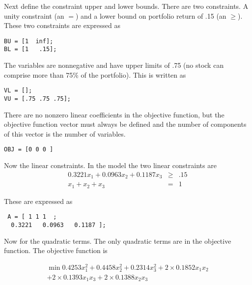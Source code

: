 \documentclass[11pt]{article}
\renewcommand{\_}{{\char"5F}}
\renewcommand{\{}{{\char"7B}}
\renewcommand{\}}{{\char"7D}}
\renewcommand{\^}{{\char"0D}}
\renewcommand{\'}{{\char"0D}}
\begin{document}
Next define the constraint upper and lower bounds. There are two constraints. A unity constraint (an $=$) and a lower bound on portfolio return of .15 (an $\ge$). These two constraints are expressed as



\begin{verbatim}
BU = [1  inf];
BL = [1   .15];
\end{verbatim}



The variables are nonnegative and have upper limits of .75 (no stock can comprise more than 75\% of the portfolio).  This is written as




\begin{verbatim}
VL = [];
VU = [.75 .75 .75];
\end{verbatim}



There are no nonzero linear coefficients in the objective function, but the objective function vector must always be defined and the number of components of this vector is the number of variables. 



\begin{verbatim}
OBJ = [0 0 0 ]
\end{verbatim}


 Now the linear constraints.   In the model the two linear constraints are
 \begin{eqnarray*}
 0.3221 x_{1} +   0.0963x_{2} +    0.1187x_{3}  &\ge& .15 \\
x_{1} + x_{2} + x_{3} &=& 1 
 \end{eqnarray*}
 

 
 These are expressed as
 

 
 \begin{verbatim}
 A = [ 1 1 1  ;
  0.3221   0.0963   0.1187 ];
 \end{verbatim}
 

Now for the quadratic terms. The only quadratic terms are in the objective function. The objective function is


\begin{eqnarray*}
\min  0.4253 x_{1}^{2} +  0.4458 x_{2}^{2} + 0.2314 x_{3}^{2} + 2 \times 0.1852 x_{1} x_{2} \\ + 2 \times 0.1393 x_{1} x_{3} + 2 \times
 0.1388 x_{2} x_{3}
\end{eqnarray*}
\end{document}
